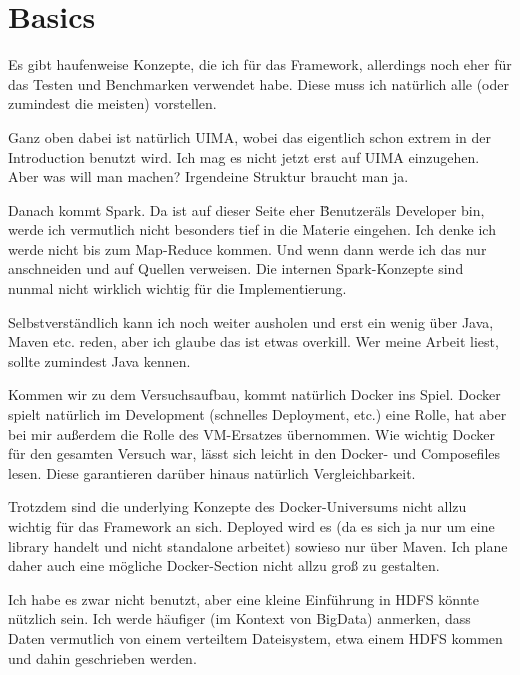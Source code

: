 
\chapter{Basics}

Es gibt haufenweise Konzepte, die ich für das Framework, allerdings noch eher für das Testen und Benchmarken verwendet habe. Diese muss ich natürlich alle (oder zumindest die meisten) vorstellen.

Ganz oben dabei ist natürlich UIMA, wobei das eigentlich schon extrem in der Introduction benutzt wird. Ich mag es nicht jetzt erst auf UIMA einzugehen. Aber was will man machen? Irgendeine Struktur braucht man ja.

Danach kommt Spark. Da ist auf dieser Seite eher \"Benutzer\" als Developer bin, werde ich vermutlich nicht besonders tief in die Materie eingehen. Ich denke ich werde nicht bis zum Map-Reduce kommen. Und wenn dann werde ich das nur anschneiden und auf Quellen verweisen. Die internen Spark-Konzepte sind nunmal nicht wirklich wichtig für die Implementierung.

Selbstverständlich kann ich noch weiter ausholen und erst ein wenig über Java, Maven etc. reden, aber ich glaube das ist etwas overkill. Wer meine Arbeit liest, sollte zumindest Java kennen.

Kommen wir zu dem Versuchsaufbau, kommt natürlich Docker ins Spiel. Docker spielt natürlich im Development (schnelles Deployment, etc.) eine Rolle, hat aber bei mir außerdem die Rolle des VM-Ersatzes übernommen. Wie wichtig Docker für den gesamten Versuch war, lässt sich leicht in den Docker- und Composefiles lesen. Diese garantieren darüber hinaus natürlich Vergleichbarkeit.

Trotzdem sind die underlying Konzepte des Docker-Universums nicht allzu wichtig für das Framework an sich. Deployed wird es (da es sich ja nur um eine library handelt und nicht standalone arbeitet) sowieso nur über Maven. Ich plane daher auch eine mögliche Docker-Section nicht allzu groß zu gestalten.

Ich habe es zwar nicht benutzt, aber eine kleine Einführung in HDFS könnte nützlich sein. Ich werde häufiger (im Kontext von BigData) anmerken, dass Daten vermutlich von einem verteiltem Dateisystem, etwa einem HDFS kommen und dahin geschrieben werden.


% 
% 
% 
